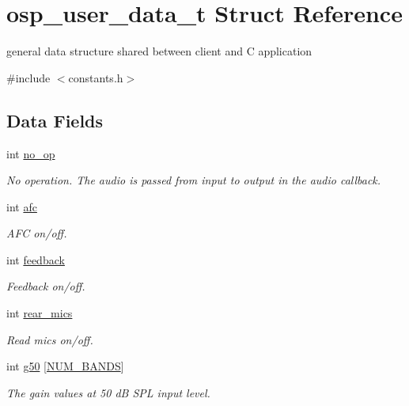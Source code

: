 \hypertarget{structosp__user__data__t}{}\section{osp\+\_\+user\+\_\+data\+\_\+t Struct Reference}
\label{structosp__user__data__t}


general data structure shared between client and C application  




{\ttfamily \#include $<$constants.\+h$>$}

\subsection*{Data Fields}
\begin{DoxyCompactItemize}
\item 
int \mbox{\hyperlink{structosp__user__data__t_ab6aa759f78ee1e7411c6591c88977c14}{no\+\_\+op}}
\begin{DoxyCompactList}\small\item\em No operation. The audio is passed from input to output in the audio callback. \end{DoxyCompactList}\item 
int \mbox{\hyperlink{structosp__user__data__t_a5eca0400f27a8aaf1b9ce3e961720af8}{afc}}
\begin{DoxyCompactList}\small\item\em A\+FC on/off. \end{DoxyCompactList}\item 
int \mbox{\hyperlink{structosp__user__data__t_a03a42dd2eac876e9bcea79061343d3df}{feedback}}
\begin{DoxyCompactList}\small\item\em Feedback on/off. \end{DoxyCompactList}\item 
int \mbox{\hyperlink{structosp__user__data__t_a509aa26b645cbc3436c862f0865f66a6}{rear\+\_\+mics}}
\begin{DoxyCompactList}\small\item\em Read mics on/off. \end{DoxyCompactList}\item 
int \mbox{\hyperlink{structosp__user__data__t_ae2f043926e510f9f990480346e2ba6fe}{g50}} \mbox{[}\mbox{\hyperlink{constants_8h_a19441d7b9be72492ed93a440085e53be}{N\+U\+M\+\_\+\+B\+A\+N\+DS}}\mbox{]}
\begin{DoxyCompactList}\small\item\em The gain values at 50 dB S\+PL input level. \end{DoxyCompactList}\item 

\end{DoxyCompactItemize}
